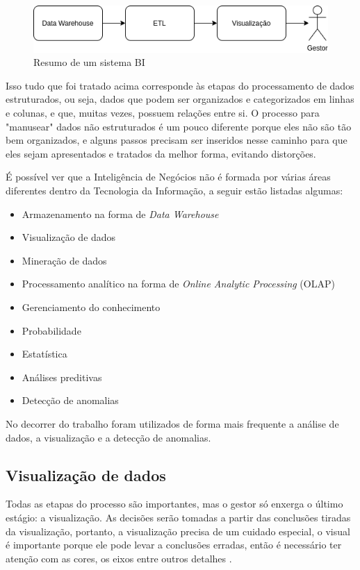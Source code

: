 \begin{figure}[h]
	\centering
	\includegraphics[scale=0.80]{./figures/cap1/resumo_bi.png}
	\caption{Resumo de um sistema BI}
\end{figure}

Isso tudo que foi tratado acima corresponde às etapas do processamento de dados estruturados, ou seja, dados que podem ser organizados e categorizados em linhas e colunas, e que, muitas vezes, possuem relações entre si. O processo para "manusear" dados não estruturados é um pouco diferente porque eles não são tão bem organizados, e alguns passos precisam ser inseridos nesse caminho para que eles sejam apresentados e tratados da melhor forma, evitando distorções.

É possível ver que a Inteligência de Negócios não é formada por várias áreas diferentes dentro da Tecnologia da Informação, a seguir estão listadas algumas:

\begin{itemize}
	\item Armazenamento na forma de \textit{Data Warehouse}
	\item Visualização de dados
	\item Mineração de dados
	\item Processamento analítico na forma de \textit{Online Analytic Processing} (OLAP)
	\item Gerenciamento do conhecimento
	\item Probabilidade
	\item Estatística
	\item Análises preditivas
	\item Detecção de anomalias
\end{itemize}

No decorrer do trabalho foram utilizados de forma mais frequente a análise de dados, a visualização e a detecção de anomalias.

\subsection{Visualização de dados}

Todas as etapas do processo são importantes, mas o gestor só enxerga o último estágio: a visualização. As decisões serão tomadas a partir das conclusões tiradas da visualização, portanto, a visualização precisa de um cuidado especial, o visual é importante porque ele pode levar a conclusões erradas, então é necessário ter atenção com as cores, os eixos entre outros detalhes \cite{claus1}.

